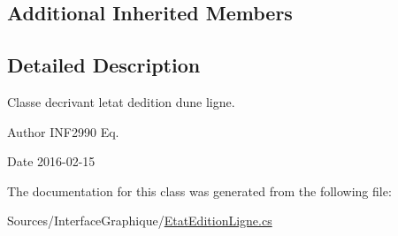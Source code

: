\subsection*{Additional Inherited Members}


\subsection{Detailed Description}
Classe decrivant l\textquotesingle{}etat d\textquotesingle{}edition d\textquotesingle{}une ligne. 

\begin{DoxyAuthor}{Author}
I\+N\+F2990 Eq. 
\end{DoxyAuthor}
\begin{DoxyDate}{Date}
2016-\/02-\/15 
\end{DoxyDate}


The documentation for this class was generated from the following file\+:\begin{DoxyCompactItemize}
\item 
Sources/\+Interface\+Graphique/\hyperlink{_etat_edition_ligne_8cs}{Etat\+Edition\+Ligne.\+cs}\end{DoxyCompactItemize}
